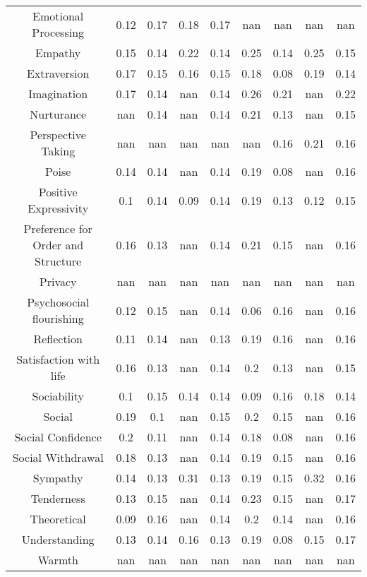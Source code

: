 \begin{table}[ht]
\begin{center}
\begin{tabular}{c@{\hspace{2pt}}|c@{\hspace{2pt}}c@{\hspace{2pt}}c@{\hspace{2pt}}c@{\hspace{2pt}}|c@{\hspace{2pt}}c@{\hspace{2pt}}c@{\hspace{2pt}}c@{\hspace{2pt}}}
\small Emotional Processing & 0.12 & 0.17 & 0.18 & 0.17 & nan & nan & nan & nan  \\
\small Empathy & 0.15 & 0.14 & 0.22 & 0.14 & 0.25 & 0.14 & 0.25 & 0.15  \\
\small Extraversion & 0.17 & 0.15 & 0.16 & 0.15 & 0.18 & 0.08 & 0.19 & 0.14  \\
\small Imagination & 0.17 & 0.14 & nan & 0.14 & 0.26 & 0.21 & nan & 0.22  \\
\small Nurturance & nan & 0.14 & nan & 0.14 & 0.21 & 0.13 & nan & 0.15  \\
\small Perspective Taking & nan & nan & nan & nan & nan & 0.16 & 0.21 & 0.16  \\
\small Poise & 0.14 & 0.14 & nan & 0.14 & 0.19 & 0.08 & nan & 0.16  \\
\small Positive Expressivity & 0.1 & 0.14 & 0.09 & 0.14 & 0.19 & 0.13 & 0.12 & 0.15  \\
\small Preference for Order and Structure & 0.16 & 0.13 & nan & 0.14 & 0.21 & 0.15 & nan & 0.16  \\
\small Privacy & nan & nan & nan & nan & nan & nan & nan & nan  \\
\small Psychosocial flourishing & 0.12 & 0.15 & nan & 0.14 & 0.06 & 0.16 & nan & 0.16  \\
\small Reflection & 0.11 & 0.14 & nan & 0.13 & 0.19 & 0.16 & nan & 0.16  \\
\small Satisfaction with life & 0.16 & 0.13 & nan & 0.14 & 0.2 & 0.13 & nan & 0.15  \\
\small Sociability & 0.1 & 0.15 & 0.14 & 0.14 & 0.09 & 0.16 & 0.18 & 0.14  \\
\small Social & 0.19 & 0.1 & nan & 0.15 & 0.2 & 0.15 & nan & 0.16  \\
\small Social Confidence & 0.2 & 0.11 & nan & 0.14 & 0.18 & 0.08 & nan & 0.16  \\
\small Social Withdrawal & 0.18 & 0.13 & nan & 0.14 & 0.19 & 0.15 & nan & 0.16  \\
\small Sympathy & 0.14 & 0.13 & 0.31 & 0.13 & 0.19 & 0.15 & 0.32 & 0.16  \\
\small Tenderness & 0.13 & 0.15 & nan & 0.14 & 0.23 & 0.15 & nan & 0.17  \\
\small Theoretical & 0.09 & 0.16 & nan & 0.14 & 0.2 & 0.14 & nan & 0.16  \\
\small Understanding & 0.13 & 0.14 & 0.16 & 0.13 & 0.19 & 0.08 & 0.15 & 0.17  \\
\small Warmth & nan & nan & nan & nan & nan & nan & nan & nan  \\
\bottomrule
\end{tabular}
\end{center}
\end{table}
